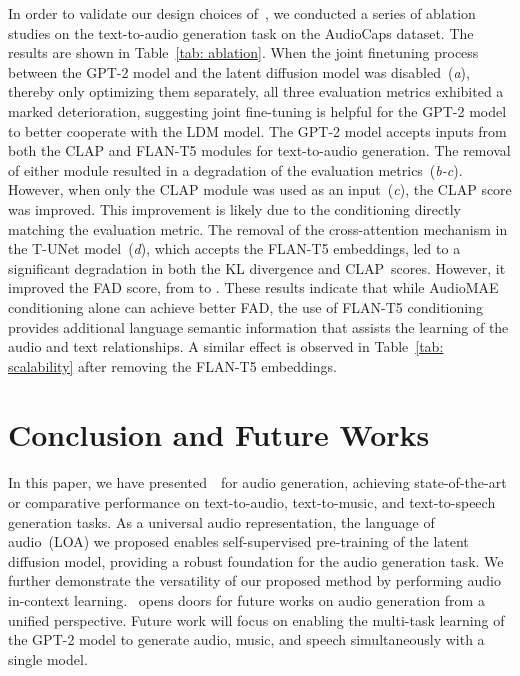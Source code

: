 \documentclass[lettersize,journal]{IEEEtran}
\begin{document}
\noindent
In order to validate our design choices of~\vModelName, we conducted a series of ablation studies on the text-to-audio generation task on the AudioCaps dataset. The results are shown in Table~\ref{tab: ablation}. When the joint finetuning process between the GPT-2 model and the latent diffusion model was disabled~(\textit{a}), thereby only optimizing them separately, all three evaluation metrics exhibited a marked deterioration, suggesting joint fine-tuning is helpful for the GPT-2 model to better cooperate with the LDM model. The GPT-2 model accepts inputs from both the CLAP and FLAN-T5 modules for text-to-audio generation. The removal of either module resulted in a degradation of the evaluation metrics~(\textit{b-c}). However, when only the CLAP module was used as an input~(\textit{c}), the CLAP score was improved. This improvement is likely due to the conditioning directly matching the evaluation metric. The removal of the cross-attention mechanism in the T-UNet model~(\textit{d}), which accepts the FLAN-T5 embeddings, led to a significant degradation in both the KL divergence and CLAP~scores. However, it improved the FAD score, from  to . These results indicate that while AudioMAE conditioning alone can achieve better FAD, the use of FLAN-T5 conditioning provides additional language semantic information that assists the learning of the audio and text relationships. A similar effect is observed in Table~\ref{tab: scalability} after removing the FLAN-T5 embeddings.







\section{Conclusion and Future Works}
\noindent
In this paper, we have presented~\vModelName~for audio generation, achieving state-of-the-art or comparative performance on text-to-audio, text-to-music, and text-to-speech generation tasks. 
As a universal audio representation, the language of audio~(LOA) we proposed enables self-supervised pre-training of the latent diffusion model, providing a robust foundation for the audio generation task.
We further demonstrate the versatility of our proposed method by performing audio in-context learning. \vModelName~opens doors for future works on audio generation from a unified perspective. Future work will focus on enabling the multi-task learning of the GPT-2 model to generate audio, music, and speech simultaneously with a single model. 
\end{document}
